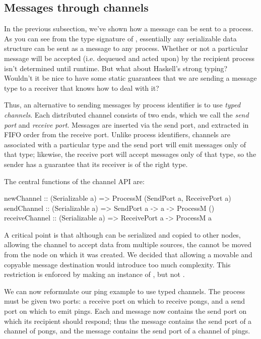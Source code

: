 \documentclass[preprint]{sigplanconf}
\begin{document}
\subsection{Messages through channels}
In the previous subsection, we've shown how a message can be sent to a process. As you can see from the type signature of , essentially any serializable data structure can be sent as a message to any process. Whether or not a particular message will be accepted (i.e. dequeued and acted upon) by the recipient process isn't determined until runtime. But what about Haskell's strong typing? Wouldn't it be nice to have some static guarantees that we are sending a message type to a receiver that knows how to deal with it?

Thus, an alternative to sending messages by process identifier is to use {\em typed channels}. Each distributed channel consists of two ends, which we call the {\em send port} and {\em receive port}. Messages are inserted via the send port, and extracted in FIFO order from the receive port. Unlike process identifiers, channels are associated with a particular type and the send port will emit messages only of that type; likewise, the receive port will accept messages only of that type, so the sender has a guarantee that its receiver is of the right type.

The central functions of the channel API are:

\begin{code}
newChannel :: (Serializable a) => ProcessM (SendPort a, ReceivePort a)
sendChannel :: (Serializable a) => SendPort a -> a -> ProcessM ()
receiveChannel :: (Serializable a) => ReceivePort a -> ProcessM a
\end{code}

A critical point is that although  can be serialized and copied to other nodes, allowing the channel to accept data from multiple sources, the  cannot be moved from the node on which it was created. We decided that allowing a movable and copyable message destination would introduce too much complexity. This restriction is enforced by making  an instance of , but not . 

We can now reformulate our ping example to use typed channels. The process must be given two ports: a receive port on which to receive pongs, and a send port on which to emit pings. Each  and  message now contains the send port on which its recipient should respond; thus the  message contains the send port of a channel of pongs, and the  message contains the send port of a channel of pings.
\end{document}
